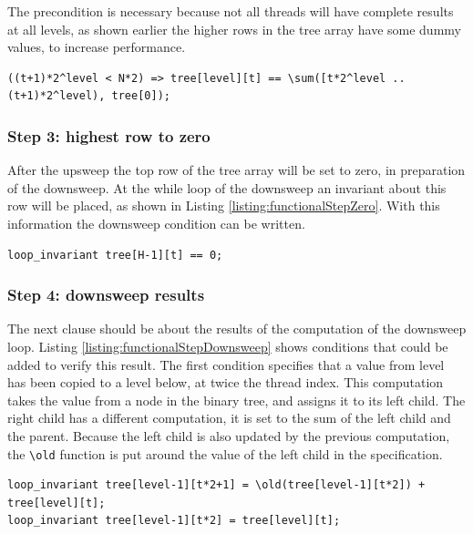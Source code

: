 \documentclass[a4paper]{article}
\newcommand{\code}[1]{\texttt{\small \color{inline}#1}} %
\begin{document}
The precondition is necessary because not all threads will have complete results at all levels, as shown earlier the higher rows in the tree array have some dummy values, to increase performance.

\begin{lstlisting}[caption=Upsweep loop\_invariant enforcing sum of inputs, label=listing:functionalStepUpsweepSum, float=htpb]
((t+1)*2^level < N*2) => tree[level][t] == \sum([t*2^level ..(t+1)*2^level), tree[0]);
\end{lstlisting}

\subsubsection{Step 3: highest row to zero}
After the upsweep the top row of the tree array will be set to zero, in preparation of the downsweep. At the while loop of the downsweep an invariant about this row will be placed, as shown in Listing \ref{listing:functionalStepZero}. With this information the downsweep condition can be written.

\begin{lstlisting}[caption=Top row of the tree array to zero, label=listing:functionalStepZero, float=htpb]
loop_invariant tree[H-1][t] == 0;
\end{lstlisting}

\subsubsection{Step 4: downsweep results} 
The next clause should be about the results of the computation of the downsweep loop. Listing \ref{listing:functionalStepDownsweep} shows conditions that could be added to verify this result. The first condition specifies that a value from level has been copied to a level below, at twice the thread index. This computation takes the value from a node in the binary tree, and assigns it to its left child. The right child has a different computation, it is set to the sum of the left child and the parent. Because the left child is also updated by the previous computation, the \code{\textbackslash old} function is put around the value of the left child in the specification.

\begin{lstlisting}[caption=Downsweep results loop\_invariant, label=listing:functionalStepDownsweep, float=htpb]
loop_invariant tree[level-1][t*2+1] = \old(tree[level-1][t*2]) + tree[level][t];
loop_invariant tree[level-1][t*2] = tree[level][t];
\end{lstlisting}
\end{document}
